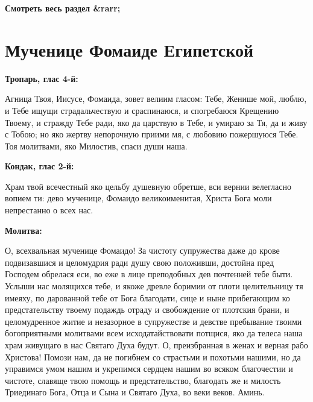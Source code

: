 \mychapterending


\bfseries Смотреть весь раздел &rarr;\normalfont{} 

\section{Мученице Фомаиде Египетской}
 


\bfseries Тропарь, глас 4-й:\normalfont{}

 Агница Твоя, Иисусе, Фомаида, зовет велиим гласом: Тебе, Женише мой, люблю, и Тебе ищущи страдальчествую и сраспинаюся, и спогребаюся Крещению Твоему, и стражду Тебе ради, яко да царствую в Тебе, и умираю за Тя, да и живу с Тобою; но яко жертву непорочную приими мя, с любовию пожершуюся Тебе. Тоя молитвами, яко Милостив, спаси души наша.


\bfseries Кондак, глас 2-й:\normalfont{}

 Храм твой всечестный яко цельбу душевную обретше, вси вернии велегласно вопием ти: дево мученице, Фомаидо великоименитая, Христа Бога моли непрестанно о всех нас.


\bfseries Молитва:\normalfont{}

 О, всехвальная мученице Фомаидо! За чистоту супружества даже до крове подвизавшися и целомудрия ради душу свою положивши, достойна пред Господем обрелася еси, во еже в лице преподобных дев почтенней тебе быти. Услыши нас молящихся тебе, и якоже древле боримии от плоти целительницу тя имеяху, по дарованной тебе от Бога благодати, сице и ныне прибегающим ко предстательству твоему подаждь отраду и свобождение от плотския брани, и целомудренное житие и незазорное в супружестве и девстве пребывание твоими богоприятными молитвами всем исходатайствовати потщися, яко да телеса наша храм живущаго в нас Святаго Духа будут. О, преизбранная в женах и верная рабо Христова! Помози нам, да не погибнем со страстьми и похотьми нашими, но да управимся умом нашим и укрепимся сердцем нашим во всяком благочестии и чистоте, славяще твою помощь и предстательство, благодать же и милость Триединаго Бога, Отца и Сына и Святаго Духа, во веки веков. Аминь. 


\mychapterending


